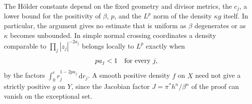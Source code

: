 The H\"older constants depend on the fixed geometry and divisor metrics, the $c_j$, a lower bound for the positivity of $\beta$, $p$, and the $L^p$ norm of the density $\kappa g$ itself. In particular, the argument gives no estimate that is uniform as $\beta$ degenerates or as $\kappa$ becomes unbounded. In simple normal crossing coordinates a density comparable to $\prod_j|z_j|^{-2a_j}$ belongs locally to $L^p$ exactly when
\begin{equation}\label{eq:snc-integrability}
 pa_j<1\quad\hbox{for every }j,
\end{equation}
by the factors $\int_0^\epsilon r_j^{1-2pa_j}\,\mathrm{d} r_j$. A smooth positive density $f$ on $X$ need not give a strictly positive $g$ on $Y$, since the Jacobian factor $J=\pi^*h^n/\beta^n$ of the proof can vanish on the exceptional set.

